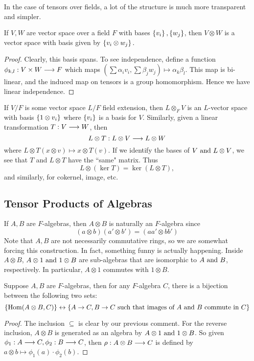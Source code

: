In the case of tensors over fields, a lot of the structure is much more transparent and simpler.
\begin{prop}\label{2.4}
If $V,W$ are vector space over a field $F$ with bases $\left\lbrace v_i \right\rbrace,\left\lbrace w_j \right\rbrace$, then $V\otimes W$ is a vector space with basis given by $\left\lbrace v_i \otimes w_j \right\rbrace.$
\end{prop}
\begin{proof}
Clearly, this basis spans. To see independence, define a function $\phi_{k,l}:V\times W \longrightarrow F$ which maps $(\sum \alpha_iv_i,\sum \beta_j w_j) \longmapsto \alpha_k \beta_l$. This map is bi-linear, and the induced map on tensors is a group homomorphism. Hence we have linear independence.
\end{proof}

If $V/F$ is some vector space $L/F$ field extension, then $L\otimes_F V$ is an $L$-vector space with basis $\left\lbrace 1\otimes v_i \right\rbrace$ where $\left\lbrace v_i \right\rbrace$ is a basis for $V$. Similarly, given a linear transformation $T:V \longrightarrow W$, then 
$$L\otimes T : L \otimes V \longrightarrow L\otimes W$$
where $L\otimes T(x\otimes v) \mapsto x \otimes T(v).$ If we identify the bases of $V \text{ and } L \otimes V$, we see that $T$ and $L\otimes T$ have the ``same" matrix. Thus 
$$L\otimes (\ker T) = \ker (L\otimes T),$$
and similarly, for cokernel, image, etc. 

\subsection{Tensor Products of Algebras}
If $A,B$ are $F$-algebras, then $A\otimes B$ is naturally an $F$-algebra since
$$(a\otimes b)(a'\otimes b') = (aa' \otimes bb')
$$
Note that $A,B$ are not necessarily commutative rings, so we are somewhat forcing this construction. In fact, something funny is actually happening. Inside $A\otimes B$, $A\otimes 1 \text{ and } 1\otimes B$ are sub-algebras that are isomorphic to $A \text{ and } B$, respectively. In particular, $A\otimes 1$ commutes with $1\otimes B$.
\begin{prop}\label{2.6}
Suppose $A,B$ are $F$-algebras, then for any $F$-algebra $C$, there is a bijection between the following two sets:
$$\left\lbrace \operatorname{Hom}(A\otimes B,C) \right\rbrace \leftrightarrow \left\lbrace A \rightarrow C,B\rightarrow C \text{ such that images of $A \text{ and } B$ commute in $C$} \right\rbrace$$
\end{prop}
\begin{proof}
The inclusion $\subseteq$ is clear by our previous comment. For the reverse inclusion, $A\otimes B$ is generated as an algebra by $A \otimes 1 \text{ and } 1 \otimes B$. So given $\phi_1:A \longrightarrow C,\phi_2: B \longrightarrow C$, then $\rho : A \otimes B \longrightarrow C$ is defined by $a \otimes b \mapsto \phi_1(a)\cdot \phi_2(b).$
\end{proof}

